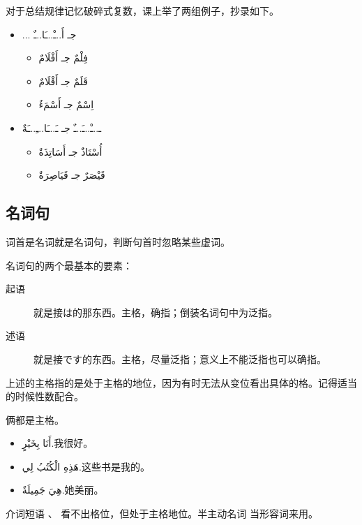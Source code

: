 \begin{note}
    对于总结规律记忆破碎式复数，课上举了两组例子，抄录如下。
    \begin{Arabic}
        \begin{itemize}
            \item ... جـ أَ..ـْ..ـَا..ـٌ
            \begin{itemize}[label=\crm{--}]
                \item فِلْمٌ جـ أَفْلَامٌ
                \item قَلَمٌ جـ أَقْلَامٌ
                \item اِسْمٌ جـ أَسْمَءٌ
            \end{itemize}
            \item ـ..ـْ..ـَ..ـٌ جـ ـَ..ـَا..ـِ..ـَةٌ
            \begin{itemize}[label=\crm{--}]
                \item أُسْتَاذٌ جـ أَسَاتِذَةٌ
                \item قَيْصَرٌ جـ قَيَاصِرَةٌ
            \end{itemize}
        \end{itemize}
    \end{Arabic}
\end{note}

\subsection{ 名词句}

词首是名词就是名词句，判断句首时忽略某些虚词。

名词句的两个最基本的要素：

\begin{description}
    \item[起语] 就是接は的那东西。主格，确指；倒装名词句中为泛指。
    \item[述语] 就是接です的东西。主格，尽量泛指；意义上不能泛指也可以确指。
\end{description}

上述的主格指的是处于主格的地位，因为有时无法从变位看出具体的格。记得适当的时候性数配合。

\begin{note}
    俩都是主格。
\end{note}

\begin{itemize}
    \item \ac{أَنَا بِخَيْرٍ.}{我很好。}
    \item \ac{هَذِهِ الْكُتُبُ لِي.}{这些书是我的。}
    \item \ac{هِيَ جَمِيلَةٌ.}{她美丽。}
\end{itemize}

介词短语 、  看不出格位，但处于主格地位。半主动名词  当形容词来用。